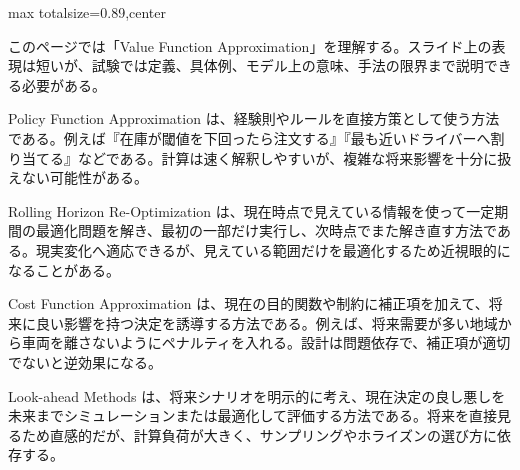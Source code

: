 \begin{minipage}[t]{0.58\textwidth}
\begin{adjustbox}{max totalsize={\textwidth}{0.89\textheight},center}
\begin{minipage}{\textwidth}\scriptsize
{}このページでは「Value Function Approximation」を理解する。スライド上の表現は短いが、試験では定義、具体例、モデル上の意味、手法の限界まで説明できる必要がある。\par
Policy Function Approximation は、経験則やルールを直接方策として使う方法である。例えば『在庫が閾値を下回ったら注文する』『最も近いドライバーへ割り当てる』などである。計算は速く解釈しやすいが、複雑な将来影響を十分に扱えない可能性がある。\par
Rolling Horizon Re-Optimization は、現在時点で見えている情報を使って一定期間の最適化問題を解き、最初の一部だけ実行し、次時点でまた解き直す方法である。現実変化へ適応できるが、見えている範囲だけを最適化するため近視眼的になることがある。\par
Cost Function Approximation は、現在の目的関数や制約に補正項を加えて、将来に良い影響を持つ決定を誘導する方法である。例えば、将来需要が多い地域から車両を離さないようにペナルティを入れる。設計は問題依存で、補正項が適切でないと逆効果になる。\par
Look-ahead Methods は、将来シナリオを明示的に考え、現在決定の良し悪しを未来までシミュレーションまたは最適化して評価する方法である。将来を直接見るため直感的だが、計算負荷が大きく、サンプリングやホライズンの選び方に依存する。\par

\end{minipage}
\end{adjustbox}
\end{minipage}
